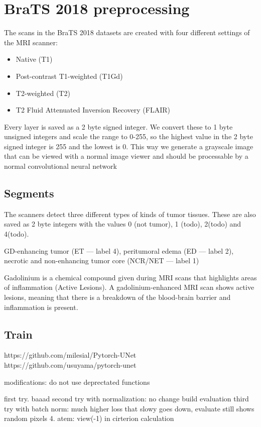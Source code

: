 \chapter{BraTS 2018 preprocessing}
The scans in the BraTS 2018 datasets are created with four different settings of the MRI scanner:

\begin{itemize}
    \item Native (T1)
    \item Post-contrast T1-weighted (T1Gd)
    \item T2-weighted (T2)
    \item T2 Fluid Attenuated Inversion Recovery (FLAIR)
\end{itemize}

Every layer is saved as a 2 byte signed integer. We convert these to 1 byte unsigned integers and scale the range to 0-255, so the highest value in the 2 byte signed integer is 255 and the lowest is 0.
This way we generate a grayscale image that can be viewed with a normal image viewer and should be processable by a normal convolutional neural network

\section{Segments}
The scanners detect three different types of kinds of tumor tissues. These are also saved as 2 byte integers with the values 0 (not tumor), 1 (todo), 2(todo) and 4(todo).


GD-enhancing tumor (ET — label 4),
peritumoral edema (ED — label 2),
necrotic and non-enhancing tumor core (NCR/NET — label 1)



Gadolinium is a chemical compound given during MRI scans that highlights areas of inflammation (Active Lesions). A gadolinium-enhanced  MRI scan shows active lesions, meaning that there is a breakdown of the blood-brain barrier and inflammation is present.


\section{Train}
https://github.com/milesial/Pytorch-UNet
https://github.com/usuyama/pytorch-unet

modifications: do not use deprectated functions

first try. baaad
second try with normalization: no change
build evaluation
third try with batch norm: much higher loss that slowy goes down, evaluate still shows random pixels
4. atem: view(-1) in cirterion calculation